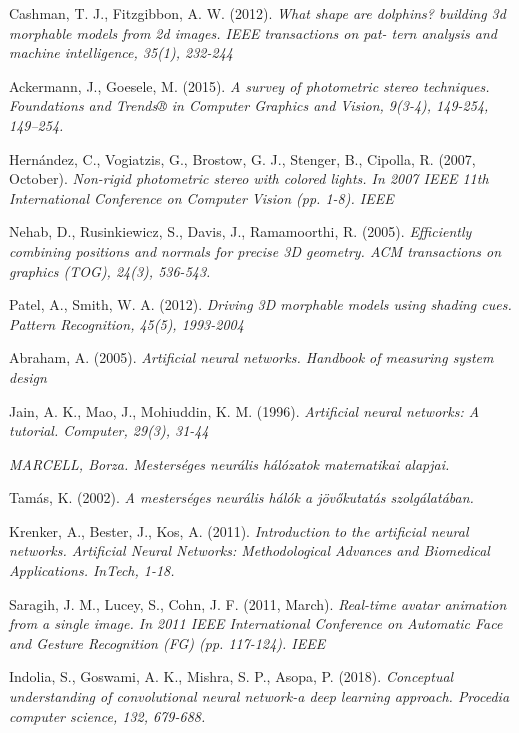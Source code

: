 \documentclass[12pt,a4]{article}
\begin{document}
\begin{thebibliography}{9}
		Cashman, T. J., Fitzgibbon, A. W. (2012).
		\textit{What shape are dolphins?
		building 3d morphable models from 2d images. IEEE transactions on pat-
		tern analysis and machine intelligence, 35(1), 232-244}
		
		Ackermann, J., Goesele, M. (2015).
		\textit{A survey of photometric stereo
			techniques. Foundations and Trends® in Computer Graphics and Vision,
			9(3-4), 149-254, 149–254.}
		
		Hernández, C., Vogiatzis, G., Brostow, G. J., Stenger, B., Cipolla,
		R. (2007, October).
		\textit{Non-rigid photometric stereo with colored lights. In
			2007 IEEE 11th International Conference on Computer Vision (pp. 1-8).
			IEEE}
		
		Nehab, D., Rusinkiewicz, S., Davis, J., Ramamoorthi, R. (2005).
		\textit{Efficiently combining positions and normals for precise 3D geometry. ACM transactions on graphics (TOG), 24(3), 536-543.}
			
		Patel, A., Smith, W. A. (2012).
		\textit{Driving 3D morphable models using shading cues. Pattern Recognition, 45(5), 1993-2004}
		
		Abraham, A. (2005).
		\textit{Artificial neural networks. Handbook of measuring system design}
		
		Jain, A. K., Mao, J., Mohiuddin, K. M. (1996).
		\textit{Artificial neural networks: A tutorial. Computer, 29(3), 31-44}
		
		\textit{MARCELL, Borza. Mesterséges neurális hálózatok matematikai alapjai.}
		
		Tamás, K. (2002).
		\textit{A mesterséges neurális hálók a jövőkutatás
			szolgálatában.}
		
		Krenker, A., Bester, J., Kos, A. (2011).
		\textit{Introduction to the artificial neural networks. Artificial Neural Networks: Methodological Advances and
			Biomedical Applications. InTech, 1-18.}
		
		Saragih, J. M., Lucey, S., Cohn, J. F. (2011, March). 
		\textit{Real-time avatar
			animation from a single image. In 2011 IEEE International Conference
			on Automatic Face and Gesture Recognition (FG) (pp. 117-124). IEEE}
		
		Indolia, S., Goswami, A. K., Mishra, S. P., Asopa, P. (2018).
		\textit{ Conceptual
			understanding of convolutional neural network-a deep learning approach.
			Procedia computer science, 132, 679-688.}
	

\end{thebibliography}
\end{document}
